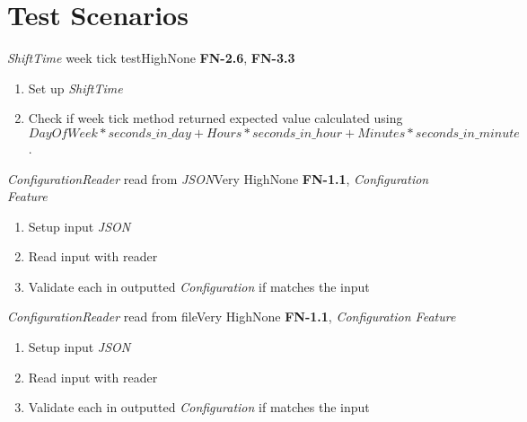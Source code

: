\chapter{Test Scenarios} \label{chp:test-scenarios}
\begin{testcase}{\emph{ShiftTime} week tick test}{High}{None}
	{
		\textbf{FN-2.6}, \textbf{FN-3.3}
	}
	{
		\begin{enumerate}
			\item Set up \emph{ShiftTime}
			\item Check if week tick method returned expected value calculated using $DayOfWeek * seconds\_in\_day + Hours * seconds\_in\_hour + Minutes * seconds\_in\_minute$.
		\end{enumerate}
	}
\end{testcase}

\begin{testcase}{\emph{ConfigurationReader} read from \emph{JSON}}{Very High}{None}
	{
		\textbf{FN-1.1}, \emph{Configuration Feature}
	}
	{
		\begin{enumerate}
			\item Setup input \emph{JSON}
			\item Read input with reader
			\item Validate each  in outputted \emph{Configuration} if matches the input
		\end{enumerate}
	}
\end{testcase}
	
\begin{testcase}{\emph{ConfigurationReader} read from file}{Very High}{None}
	{
		\textbf{FN-1.1}, \emph{Configuration Feature}
	}
	{
		\begin{enumerate}
			\item Setup input \emph{JSON}
			\item Read input with reader
			\item Validate each  in outputted \emph{Configuration} if matches the input
		\end{enumerate}
	}
\end{testcase}
	
